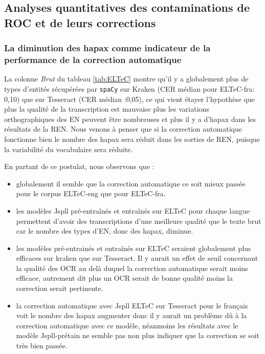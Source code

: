 %    


\subsection{Analyses quantitatives des contaminations de ROC et de leurs corrections}
\label{subsec:quantitative_COR-OCR-IMPACT-NER}
\subsubsection{La diminution des hapax comme indicateur de la performance de la correction automatique}
La colonne \textit{Brut} du tableau \ref{tab:ELTeC} montre qu'il y a globalement plus de types d'entités récupérées par \texttt{spaCy} sur Kraken (CER médian pour ELTeC-fra: 0,10) que sur Tesseract (CER médian :0,05), ce qui vient étayer l'hypothèse que plus la qualité de la transcription est mauvaise plus les variations orthographiques des EN peuvent être nombreuses et plus il y a d'hapax dans les résultats de la REN. Nous venons à penser que si la correction automatique fonctionne bien le nombre des hapax sera réduit dans les sorties de REN, puisque la variabilité du vocabulaire sera réduite.

En partant de ce postulat, nous observons que :
\begin{itemize}
\item globalement il semble que la correction automatique ce soit mieux passée pour le corpus ELTeC-eng que pour ELTeC-fra.
\item les modèles Jspll pré-entraînés et entraînés sur ELTeC pour chaque langue permettent d'avoir des transcriptions d'une meilleure qualité que le texte brut car le nombre des types d'EN, donc des hapax, diminue.
\item les modèles pré-entrainés  et entraînés sur ELTeC seraient globalement plus efficaces sur kraken que sur Tesseract. Il y aurait un effet de seuil concernant la qualité des OCR au delà duquel la correction automatique serait moins efficace, autrement dit plus un OCR serait de bonne qualité moins la correction serait pertinente. 
\item la correction automatique avec Jspll ELTeC sur Tesseract pour le français voit le nombre des hapax augmenter donc il y aurait un problème dû à la correction automatique avec ce modèle, néanmoins les résultats avec le modèle Jspll-prétain ne semble pas non plus indiquer que la correction se soit très bien passée.
\end{itemize}
 
